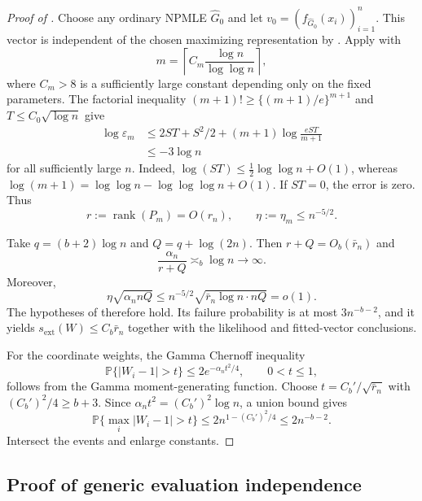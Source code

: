 \documentclass[11pt]{article}
\theoremstyle{definition}
\theoremstyle{remark}
\DeclareMathOperator{\rank}{rank}
\newcommand{\PP}{\mathbb P}
\newcommand{\abs}[1]{\lvert #1\rvert}
\newcommand{\Ghat}{\widehat G}
\newcommand{\eps}{\varepsilon}
\begin{document}
\begin{proof}[Proof of ]
Choose any ordinary NPMLE $\Ghat_0$ and let
$v_0=(f_{\Ghat_0}(x_i))_{i=1}^n$.  This vector is independent of the chosen
maximizing representation by .  Apply
 with
\[
 m=\left\lceil C_m\frac{\log n}{\log\log n}\right\rceil,
\]
where $C_m>8$ is a sufficiently large constant depending only on the fixed
parameters.  The factorial inequality $(m+1)!\ge\{(m+1)/e\}^{m+1}$ and
$T\le C_0\sqrt{\log n}$ give
\begin{align*}
 \log\eps_m
 &\le 2ST+S^2/2+(m+1)\log\frac{eST}{m+1}\\
 &\le-3\log n
\end{align*}
for all sufficiently large $n$.  Indeed,
$\log(ST)\le\tfrac12\log\log n+O(1)$, whereas
$\log(m+1)=\log\log n-\log\log\log n+O(1)$.  If $ST=0$, the error is zero.
Thus
\[
 r:=\rank(P_m)=O(r_n),\qquad
 \eta:=\eta_m\le n^{-5/2}.
\]

Take $q=(b+2)\log n$ and $Q=q+\log(2n)$.  Then
$r+Q=O_b(\bar r_n)$ and
\[
 \frac{\alpha_n}{r+Q}\asymp_b\log n\to\infty.
\]
Moreover,
\[
 \eta\sqrt{\alpha_n nQ}
 \le n^{-5/2}\sqrt{\bar r_n\log n\cdot nQ}=o(1).
\]
The hypotheses of  therefore hold.  Its failure
probability is at most $3n^{-b-2}$, and it yields
$s_{\mathrm{ext}}(W)\le C_b\bar r_n$ together with the likelihood and
fitted-vector conclusions.

For the coordinate weights, the Gamma Chernoff inequality
\begin{equation}\label{eq:gamma-coordinate}
 \PP\{\abs{W_i-1}>t\}\le2e^{-\alpha_nt^2/4},
 \qquad 0<t\le1,
\end{equation}
follows from the Gamma moment-generating function.  Choose
$t=C_b'/\sqrt{\bar r_n}$ with $(C_b')^2/4\ge b+3$.  Since
$\alpha_nt^2=(C_b')^2\log n$, a union bound gives
\[
 \PP\{\max_i\abs{W_i-1}>t\}
 \le2n^{1-(C_b')^2/4}\le2n^{-b-2}.
\]
Intersect the events and enlarge constants.
\end{proof}

\subsection{Proof of generic evaluation independence}
\label{app:generic}
\end{document}
